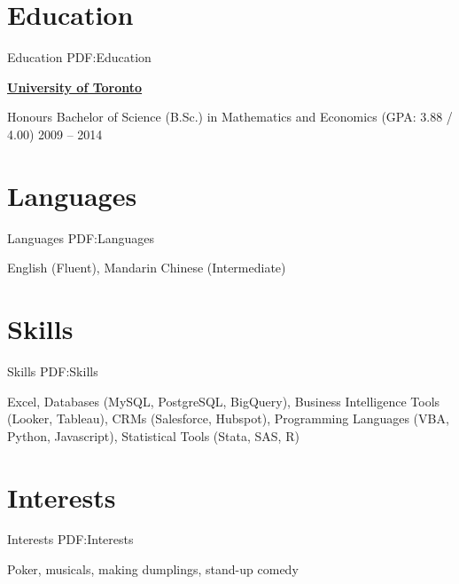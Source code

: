 \documentclass[letterpaper,10pt,oneside]{article}
\begin{document}
\begin{body}

\section
{Education}
{Education}
{PDF:Education}

\href{https://www.utoronto.ca/}
{\textbf{University of Toronto}}

\GapNoBreak
\BulletItem
Honours Bachelor of Science (B.Sc.) in Mathematics and Economics (GPA: 3.88 / 4.00)
\hfill
2009 -- 2014


\section
{Languages}
{Languages}
{PDF:Languages}

English (Fluent), Mandarin Chinese (Intermediate)


\section
{Skills}
{Skills}
{PDF:Skills}

Excel, Databases (MySQL, PostgreSQL, BigQuery), Business Intelligence Tools (Looker, Tableau), CRMs (Salesforce, Hubspot), Programming Languages (VBA, Python, Javascript), Statistical Tools (Stata, SAS, R)


\section
{Interests}
{Interests}
{PDF:Interests}

Poker, musicals, making dumplings, stand-up comedy

\end{body}
\end{document}
